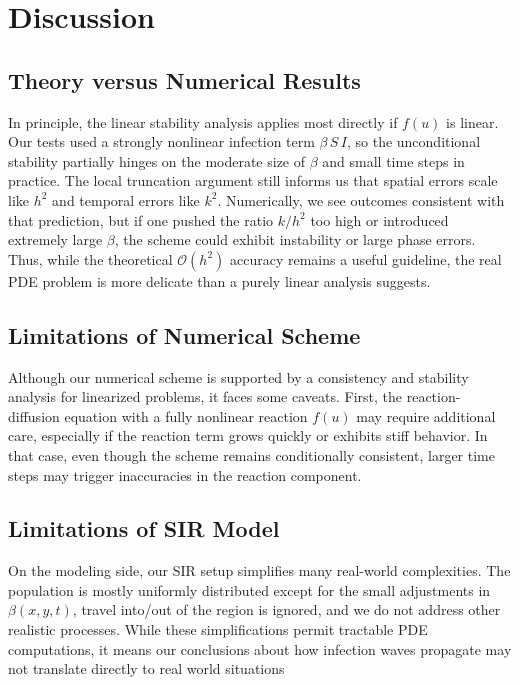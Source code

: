 \section{Discussion}

\subsection{Theory versus Numerical Results}
In principle, the linear stability analysis applies most directly if \(f(u)\) is linear. Our tests used a strongly 
nonlinear infection term \(\beta\,S\,I\), so the unconditional stability partially hinges on the moderate size of 
\(\beta\) and small time steps in practice. The local truncation argument still informs us that spatial errors 
scale like \(h^2\) and temporal errors like \(k^2\). Numerically, we see outcomes 
consistent with that prediction, but if one pushed the ratio \(k/h^2\) too high or introduced extremely large 
\(\beta\), the scheme could exhibit instability or large phase errors. Thus, while the theoretical 
\(\mathcal{O}(h^2)\) accuracy remains a useful guideline, the real PDE problem is more delicate than a purely 
linear analysis suggests.

\subsection{Limitations of Numerical Scheme}
Although our numerical scheme is supported by a consistency and stability analysis for linearized 
problems, it faces some caveats. First, the reaction-diffusion equation with a fully nonlinear 
reaction \(f(u)\) may require additional care, especially if the reaction term grows quickly or exhibits stiff 
behavior. In that case, even though the scheme remains conditionally consistent, larger time steps may trigger 
inaccuracies in the reaction component.

\subsection{Limitations of SIR Model}
On the modeling side, our SIR setup simplifies many real-world complexities. The population is mostly uniformly 
distributed except for the small adjustments in \(\beta(x,y,t)\), travel into/out of the region is ignored, 
and we do not address other realistic processes. While these simplifications permit tractable PDE computations, 
it means our conclusions about how infection waves propagate may not translate directly to real world situations